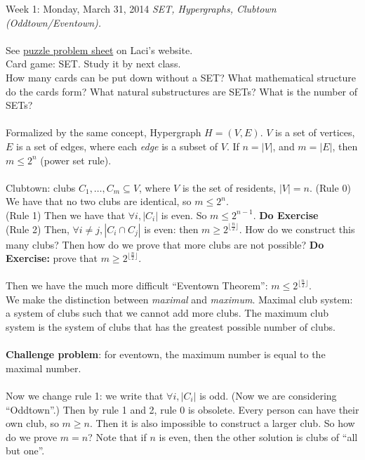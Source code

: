\documentclass[12pt]{article}
\theoremstyle{remark}
\begin{document}
\newpage
\label{1}\begin{section}{Week 1: Monday, March 31, 2014}
\indent\textit{SET, Hypergraphs, Clubtown (Oddtown/Eventown).}
\\\\
See \href{http://people.cs.uchicago.edu/~laci/REU12/puzzles.pdf}{puzzle problem sheet} on Laci's website.
\\Card game: SET. Study it by next class.
\\How many cards can be put down without a SET? What mathematical structure do the cards form? What natural substructures are SETs? What is the number of SETs?
\\\\Formalized by the same concept, Hypergraph $H = (V,E)$.  $V$ is a set of vertices, $E$ is a set of edges, where each \textit{edge} is a subset of $V$. If $n = |V|$, and $m = |E|$, then $m \leq 2^n$ (power set rule).
\\\\
Clubtown: clubs $C_1,\ldots,C_m \subseteq V$, where $V$ is the set of residents, $|V| = n$. (Rule 0) We have that no two clubs are identical, so $m \leq 2^n$. 
\\ (Rule 1) Then we have that $\forall i, |C_i|$ is even. So $m \leq 2^{n-1}$. \textbf{Do Exercise}
\\(Rule 2) Then, $\forall i \neq j, |C_i \cap C_j|$ is even: then $m \geq 2^{\lfloor{\frac{n}{2}}\rfloor}$. How do we construct this many clubs? Then how do we prove that more clubs are not possible? \textbf{Do Exercise:} prove that $m \geq 2^{\lfloor{\frac{n}{2}}\rfloor}$.
\\\\Then we have the much more difficult ``Eventown Theorem'': $m \leq 2^{\lfloor{\frac{n}{2}}\rfloor}$.
\\We make the distinction between \textit{maximal} and \textit{maximum}. Maximal club system: a system of clubs such that we cannot add more clubs. The maximum club system is the system of clubs that has the greatest possible number of clubs.
\\\\\textbf{Challenge problem}: for eventown, the maximum number is equal to the maximal number. 
\\\\Now we change rule 1: we write that $\forall i, |C_i|$ is odd. (Now we are considering ``Oddtown''.) Then by rule 1 and 2, rule $0$ is obsolete. Every person can have their own club, so $m \geq n$. Then it is also impossible to construct a larger club. So how do we prove $m = n$? Note that if $n$ is even, then the other solution is clubs of ``all but one''.

\end{section}
\end{document}
